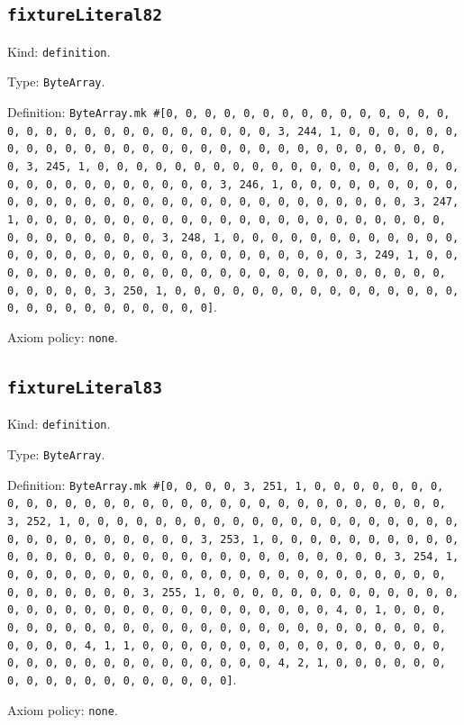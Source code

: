 \documentclass[11pt]{article}
\begin{document}
\subsection*{\texttt{fixtureLiteral82}}
\noindent Kind: \texttt{definition}.\par
\noindent Type: \texttt{ByteArray}.\par
\noindent Definition: \texttt{ByteArray.mk \#[0, 0, 0, 0, 0, 0, 0, 0, 0, 0, 0, 0, 0, 0, 0, 0, 0, 0, 0, 0, 0, 0, 0, 0, 0, 0, 0, 0, 0, 3, 244, 1, 0, 0, 0, 0, 0, 0, 0, 0, 0, 0, 0, 0, 0, 0, 0, 0, 0, 0, 0, 0, 0, 0, 0, 0, 0, 0, 0, 0, 0, 0, 3, 245, 1, 0, 0, 0, 0, 0, 0, 0, 0, 0, 0, 0, 0, 0, 0, 0, 0, 0, 0, 0, 0, 0, 0, 0, 0, 0, 0, 0, 0, 0, 0, 3, 246, 1, 0, 0, 0, 0, 0, 0, 0, 0, 0, 0, 0, 0, 0, 0, 0, 0, 0, 0, 0, 0, 0, 0, 0, 0, 0, 0, 0, 0, 0, 0, 3, 247, 1, 0, 0, 0, 0, 0, 0, 0, 0, 0, 0, 0, 0, 0, 0, 0, 0, 0, 0, 0, 0, 0, 0, 0, 0, 0, 0, 0, 0, 0, 0, 3, 248, 1, 0, 0, 0, 0, 0, 0, 0, 0, 0, 0, 0, 0, 0, 0, 0, 0, 0, 0, 0, 0, 0, 0, 0, 0, 0, 0, 0, 0, 0, 0, 3, 249, 1, 0, 0, 0, 0, 0, 0, 0, 0, 0, 0, 0, 0, 0, 0, 0, 0, 0, 0, 0, 0, 0, 0, 0, 0, 0, 0, 0, 0, 0, 0, 3, 250, 1, 0, 0, 0, 0, 0, 0, 0, 0, 0, 0, 0, 0, 0, 0, 0, 0, 0, 0, 0, 0, 0, 0, 0, 0, 0, 0]}.\par
\noindent Axiom policy: \texttt{none}.\par
\subsection*{\texttt{fixtureLiteral83}}
\noindent Kind: \texttt{definition}.\par
\noindent Type: \texttt{ByteArray}.\par
\noindent Definition: \texttt{ByteArray.mk \#[0, 0, 0, 0, 3, 251, 1, 0, 0, 0, 0, 0, 0, 0, 0, 0, 0, 0, 0, 0, 0, 0, 0, 0, 0, 0, 0, 0, 0, 0, 0, 0, 0, 0, 0, 0, 0, 3, 252, 1, 0, 0, 0, 0, 0, 0, 0, 0, 0, 0, 0, 0, 0, 0, 0, 0, 0, 0, 0, 0, 0, 0, 0, 0, 0, 0, 0, 0, 0, 0, 3, 253, 1, 0, 0, 0, 0, 0, 0, 0, 0, 0, 0, 0, 0, 0, 0, 0, 0, 0, 0, 0, 0, 0, 0, 0, 0, 0, 0, 0, 0, 0, 0, 3, 254, 1, 0, 0, 0, 0, 0, 0, 0, 0, 0, 0, 0, 0, 0, 0, 0, 0, 0, 0, 0, 0, 0, 0, 0, 0, 0, 0, 0, 0, 0, 0, 3, 255, 1, 0, 0, 0, 0, 0, 0, 0, 0, 0, 0, 0, 0, 0, 0, 0, 0, 0, 0, 0, 0, 0, 0, 0, 0, 0, 0, 0, 0, 0, 0, 4, 0, 1, 0, 0, 0, 0, 0, 0, 0, 0, 0, 0, 0, 0, 0, 0, 0, 0, 0, 0, 0, 0, 0, 0, 0, 0, 0, 0, 0, 0, 0, 0, 4, 1, 1, 0, 0, 0, 0, 0, 0, 0, 0, 0, 0, 0, 0, 0, 0, 0, 0, 0, 0, 0, 0, 0, 0, 0, 0, 0, 0, 0, 0, 0, 0, 4, 2, 1, 0, 0, 0, 0, 0, 0, 0, 0, 0, 0, 0, 0, 0, 0, 0, 0, 0, 0]}.\par
\noindent Axiom policy: \texttt{none}.\par
\end{document}
